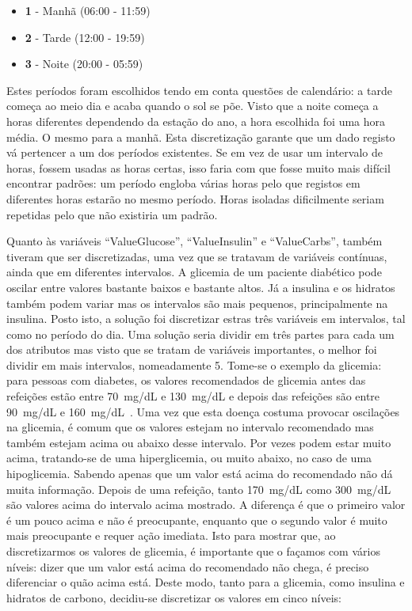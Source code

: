 \begin{itemize}
\item \textbf{1} - Manhã (06:00 - 11:59)
\item \textbf{2} - Tarde (12:00 - 19:59)
\item \textbf{3} - Noite (20:00 - 05:59)
\end{itemize}
Estes períodos foram escolhidos tendo em conta questões de calendário: a tarde começa ao meio dia e acaba quando o sol se põe. Visto que a noite começa a horas diferentes dependendo da estação do ano, a hora escolhida foi uma hora média. O mesmo para a manhã. Esta discretização garante que um dado registo vá pertencer a um dos períodos existentes.  Se em vez de usar um intervalo de horas, fossem usadas as horas certas, isso faria com que fosse muito mais difícil encontrar padrões: um período engloba várias horas pelo que registos em diferentes horas estarão no mesmo período. Horas isoladas dificilmente seriam repetidas pelo que não existiria um padrão.

Quanto às variáveis ``Value\textunderscore Glucose'', ``Value\textunderscore Insulin'' e ``Value\textunderscore Carbs'', também tiveram que ser discretizadas, uma vez que se tratavam de variáveis contínuas, ainda que em diferentes intervalos. A glicemia de um paciente diabético pode oscilar entre valores bastante baixos e bastante altos. Já a insulina e os hidratos também podem variar mas os intervalos são mais pequenos, principalmente na insulina. 
Posto isto, a solução foi discretizar estras três variáveis em intervalos, tal como no período do dia. 
Uma solução seria dividir em três partes para cada um dos atributos mas visto que se tratam de variáveis importantes, o melhor foi dividir em mais intervalos, nomeadamente 5.
Tome-se o exemplo da glicemia: para pessoas com diabetes, os valores recomendados de glicemia antes das refeições estão entre 70~mg/dL e 130~mg/dL e depois das refeições são entre 90~mg/dL e 160~mg/dL~\cite{levels}. Uma vez que esta doença costuma provocar oscilações na glicemia, é comum que os valores estejam no intervalo recomendado mas também estejam acima ou abaixo desse intervalo. Por vezes podem estar muito acima, tratando-se de uma hiperglicemia, ou muito abaixo, no caso de uma hipoglicemia. Sabendo apenas que um valor está acima do recomendado não dá muita informação. Depois de uma refeição, tanto 170~mg/dL como 300~mg/dL são valores acima do intervalo acima mostrado. A diferença é que o primeiro valor é um pouco acima e não é preocupante, enquanto que o segundo valor é muito mais preocupante e requer ação imediata. Isto para mostrar que, ao discretizarmos os valores de glicemia, é importante que o façamos com vários níveis: dizer que um valor está acima do recomendado não chega, é preciso diferenciar o quão acima está. Deste modo, tanto para a glicemia, como insulina e hidratos de carbono, decidiu-se discretizar os valores em cinco níveis:

